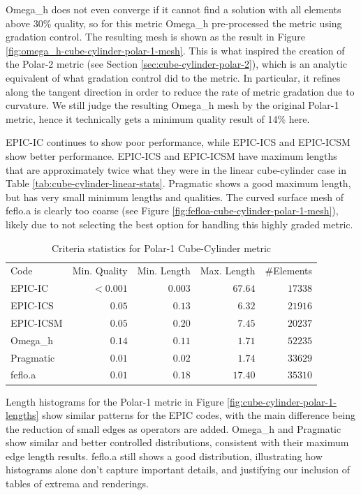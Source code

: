 \documentclass[3p,times,procedia,number]{elsarticle}
\begin{document}
Omega\_h does not even converge if it cannot find a solution with
all elements above 30\% quality, so for this metric Omega\_h
pre-processed the metric using gradation control.\cite{Borouchaki-1998-gradation,alauzet-fead-2010-size-gradation-aniso}
The resulting mesh is shown as the result in Figure \ref{fig:omega_h-cube-cylinder-polar-1-mesh}.
This is what inspired the creation of the Polar-2 metric
(see Section \ref{sec:cube-cylinder-polar-2}),
which is an analytic equivalent of what gradation control did
to the metric.
In particular, it refines along the tangent direction
in order to reduce the rate of metric gradation due to curvature.
We still judge the resulting Omega\_h mesh by the original Polar-1
metric, hence it technically gets a minimum quality result of 14\% here.

EPIC-IC continues to show poor performance, while EPIC-ICS
and EPIC-ICSM show better performance.
EPIC-ICS and EPIC-ICSM have maximum lengths that are approximately
twice what they were in the linear cube-cylinder case in
Table \ref{tab:cube-cylinder-linear-stats}.
Pragmatic shows a good maximum length,
but has very small minimum lengths and qualities.
The curved surface mesh of feflo.a is clearly too coarse
(see Figure \ref{fig:fefloa-cube-cylinder-polar-1-mesh}),
likely due to not selecting the best option for handling
this highly graded metric.

\begin{table}
\caption{Criteria statistics for Polar-1 Cube-Cylinder metric}
\label{tab:polar-1-stats}
\begin{tabular}{lrrrr}
Code & Min. Quality & Min. Length & Max. Length & \#Elements\\
EPIC-IC    &$<0.001$&      $0.003$&      $67.64$&    $17338$\\
EPIC-ICS   &$  0.05$&      $ 0.13$&      $ 6.32$&    $21916$\\
EPIC-ICSM  &$  0.05$&      $ 0.20$&      $ 7.45$&    $20237$\\
Omega\_h   &$  0.14$&      $ 0.11$&      $ 1.71$&    $52235$\\
Pragmatic  &$  0.01$&      $ 0.02$&      $ 1.74$&    $33629$\\
feflo.a    &$  0.01$&      $ 0.18$&      $17.40$&    $35310$\\
\end{tabular}
\end{table}

Length histograms for the Polar-1 metric in Figure \ref{fig:cube-cylinder-polar-1-lengths}
show similar patterns for the EPIC codes, with the main difference being the
reduction of small edges as operators are added.
Omega\_h and Pragmatic show similar and better controlled distributions, consistent
with their maximum edge length results.
feflo.a still shows a good distribution, illustrating how histograms alone
don't capture important details, and justifying our inclusion of tables of extrema
and renderings.
\end{document}
